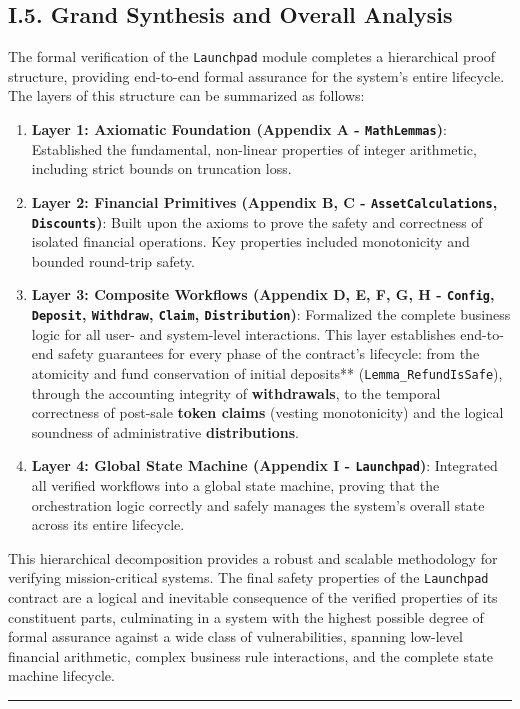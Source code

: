 \documentclass[
  english,
  onecolumn]{article}
\providecommand{\tightlist}{%
  \setlength{\itemsep}{0pt}\setlength{\parskip}{0pt}}
\begin{document}
\subsection{I.5. Grand Synthesis and Overall
Analysis}\label{i.5.-grand-synthesis-and-overall-analysis}

The formal verification of the \texttt{Launchpad} module completes a
hierarchical proof structure, providing end-to-end formal assurance for
the system's entire lifecycle. The layers of this structure can be
summarized as follows:

\begin{enumerate}
\def\labelenumi{\arabic{enumi}.}
\tightlist
\item
  \textbf{Layer 1: Axiomatic Foundation (Appendix A -
  \texttt{MathLemmas})}: Established the fundamental, non-linear
  properties of integer arithmetic, including strict bounds on
  truncation loss.
\item
  \textbf{Layer 2: Financial Primitives (Appendix B, C -
  \texttt{AssetCalculations}, \texttt{Discounts})}: Built upon the
  axioms to prove the safety and correctness of isolated financial
  operations. Key properties included monotonicity and bounded
  round-trip safety.
\item
  \textbf{Layer 3: Composite Workflows (Appendix D, E, F, G, H -
  \texttt{Config}, \texttt{Deposit}, \texttt{Withdraw}, \texttt{Claim},
  \texttt{Distribution})}: Formalized the complete business logic for
  all user- and system-level interactions. This layer establishes
  end-to-end safety guarantees for every phase of the contract's
  lifecycle: from the atomicity and fund conservation of initial \emph{
  }deposits** (\texttt{Lemma\_RefundIsSafe}), through the accounting
  integrity of \textbf{withdrawals}, to the temporal correctness of
  post-sale \textbf{token claims} (vesting monotonicity) and the logical
  soundness of administrative \textbf{distributions}.
\item
  \textbf{Layer 4: Global State Machine (Appendix I -
  \texttt{Launchpad})}: Integrated all verified workflows into a global
  state machine, proving that the orchestration logic correctly and
  safely manages the system's overall state across its entire lifecycle.
\end{enumerate}

This hierarchical decomposition provides a robust and scalable
methodology for verifying mission-critical systems. The final safety
properties of the \texttt{Launchpad} contract are a logical and
inevitable consequence of the verified properties of its constituent
parts, culminating in a system with the highest possible degree of
formal assurance against a wide class of vulnerabilities, spanning
low-level financial arithmetic, complex business rule interactions, and
the complete state machine lifecycle.

\begin{center}\rule{0.5\linewidth}{0.5pt}\end{center}

\renewcommand\refname{References}


\thispagestyle{empty}
\end{document}
